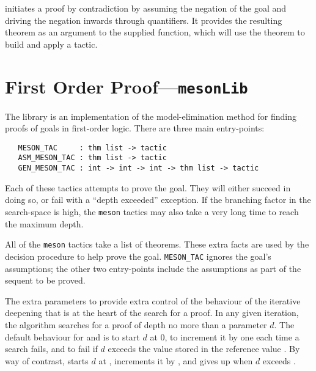  initiates a proof by contradiction by assuming
the negation of the goal and driving the negation inwards through
quantifiers. It provides the resulting theorem as an argument to the
supplied function, which will use the theorem to build and apply a
tactic.

\section{First Order Proof---\texttt{mesonLib}}
\label{sec:mesonLib}

The  library is an implementation of the
model-elimination method for finding proofs of goals in first-order
logic.  There are three main entry-points:

\begin{verbatim}
   MESON_TAC     : thm list -> tactic
   ASM_MESON_TAC : thm list -> tactic
   GEN_MESON_TAC : int -> int -> int -> thm list -> tactic
\end{verbatim}

Each of these tactics attempts to prove the goal.  They will either
succeed in doing so, or fail with a ``depth exceeded'' exception.  If
the branching factor in the search-space is high, the \texttt{meson}
tactics may also take a very long time to reach the maximum depth.

All of the \texttt{meson} tactics take a list of theorems.  These
extra facts are used by the decision procedure to help prove the goal.
\texttt{MESON\_TAC} ignores the goal's assumptions; the other two
entry-points include the assumptions as part of the sequent to be
proved.

The extra parameters to  provide extra control of
the behaviour of the iterative deepening that is at the heart of the
search for a proof.  In any given iteration, the algorithm searches
for a proof of depth no more than a parameter $d$.  The default
behaviour for  and  is to start $d$
at 0, to increment it by one each time a search fails, and to fail if
$d$ exceeds the value stored in the reference value
.  By way of contrast,
 starts $d$ at , increments
it by , and gives up when $d$ exceeds .



